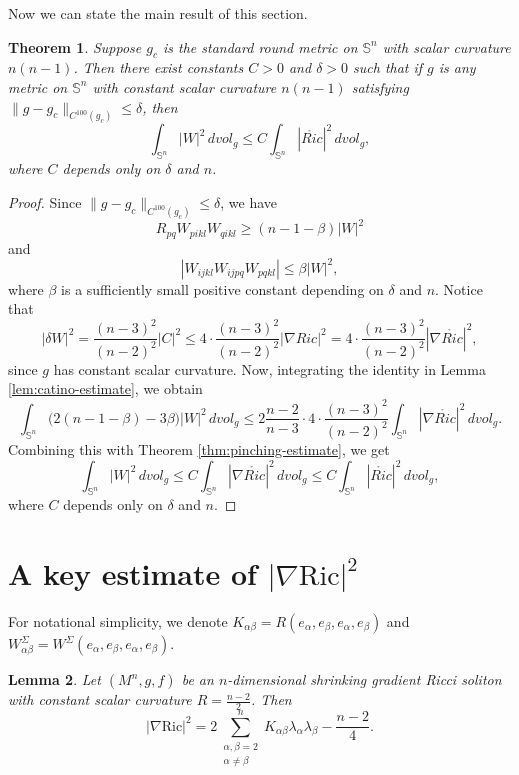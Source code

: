 \documentclass[a4, 12pt]{amsart}
\theoremstyle{plain}
\newtheorem{theo}{Theorem}[section]
\newtheorem{lem}[theo]{Lemma}
\begin{document}
Now we can state the main result of this section.

\begin{theo}\label{thm:weyl-curvature-estimate}
	Suppose $g_c$ is the standard round metric on $\mathbb{S}^n$ with scalar curvature $n(n-1)$. Then there exist constants $C > 0$ and $\delta > 0$ such that if $g$ is any metric on $\mathbb{S}^n$ with constant scalar curvature $n(n-1)$ satisfying $\|g - g_c\|_{C^{100}(g_c)} \leq \delta$, then
	\[
	\int_{\mathbb{S}^n} |W|^2 \, dvol_g \leq C \int_{\mathbb{S}^n} |\mathring{Ric}|^2 \, dvol_g,
	\]
	where $C$ depends only on $\delta$ and $n$.
\end{theo}

\begin{proof}
	Since $\|g - g_c\|_{C^{100}(g_c)} \leq \delta$, we have
	\[
	R_{pq}W_{pikl}W_{qikl} \geq (n-1-\beta)|W|^2
	\]
	and
	\[
	|W_{ijkl}W_{ijpq}W_{pqkl}| \leq \beta|W|^2,
	\]
	where $\beta$ is a sufficiently small positive constant depending on $\delta$ and $n$. Notice that
	\[
	|\delta W|^2 = \frac{(n-3)^2}{(n-2)^2}|C|^2 \leq 4 \cdot \frac{(n-3)^2}{(n-2)^2}|\nabla Ric|^2 = 4 \cdot \frac{(n-3)^2}{(n-2)^2}|\nabla \mathring{Ric}|^2,
	\]
	since $g$ has constant scalar curvature. Now, integrating the identity in Lemma \ref{lem:catino-estimate}, we obtain
	\[
	\int_{\mathbb{S}^n} \bigl(2(n-1-\beta) - 3\beta\bigr)|W|^2 \, dvol_g \leq 2\frac{n-2}{n-3} \cdot 4 \cdot \frac{(n-3)^2}{(n-2)^2} \int_{\mathbb{S}^n} |\nabla \mathring{Ric}|^2 \, dvol_g.
	\]
	Combining this with Theorem \ref{thm:pinching-estimate}, we get
	\[
	\int_{\mathbb{S}^n} |W|^2 \, dvol_g \leq C \int_{\mathbb{S}^n} |\nabla \mathring{Ric}|^2 \, dvol_g \leq C \int_{\mathbb{S}^n} |\mathring{Ric}|^2 \, dvol_g,
	\]
	where $C$ depends only on $\delta$ and $n$.
\end{proof}




\section{A key estimate of $|\nabla \mathrm{Ric}|^2$}\label{sec:key-estimate}

For notational simplicity, we denote $K_{\alpha\beta} = R(e_\alpha, e_\beta, e_\alpha, e_\beta)$ and $W^\Sigma_{\alpha\beta} = W^\Sigma(e_\alpha, e_\beta, e_\alpha, e_\beta)$.

\begin{lem}\label{lem:ricci-gradient}
	Let $(M^n, g, f)$ be an $n$-dimensional shrinking gradient Ricci soliton with constant scalar curvature $R = \frac{n-2}{2}$. Then
	\begin{equation*}\label{eq:ricci-gradient}
		|\nabla \mathrm{Ric}|^2 = 2\sum_{\substack{\alpha,\beta=2 \\ \alpha\neq\beta}}^n K_{\alpha\beta}\lambda_{\alpha}\lambda_{\beta} - \frac{n-2}{4}.
	\end{equation*}
\end{lem}
\end{document}
